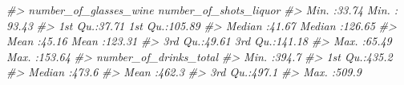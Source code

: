 \documentclass[
]{krantz}
\makeatletter
\newenvironment{Shaded}{\begin{snugshade}}{\end{snugshade}}
\newcommand{\CommentTok}[1]{\textcolor[rgb]{0.37,0.37,0.37}{\textit{#1}}}
\newenvironment{kframe}{%
\medskip{}
\setlength{\fboxsep}{.8em}
 \def\at@end@of@kframe{}%
 \ifinner\ifhmode%
  \def\at@end@of@kframe{\end{minipage}}%
  \begin{minipage}{\columnwidth}%
 \fi\fi%
 \def\FrameCommand##1{\hskip\@totalleftmargin \hskip-\fboxsep
 \colorbox{shadecolor}{##1}\hskip-\fboxsep
     \hskip-\linewidth \hskip-\@totalleftmargin \hskip\columnwidth}%
 \MakeFramed {\advance\hsize-\width
   \@totalleftmargin\z@ \linewidth\hsize
   \@setminipage}}%
 {\par\unskip\endMakeFramed%
 \at@end@of@kframe}
\renewenvironment{Shaded}{\begin{kframe}}{\end{kframe}}
\makeatother
\begin{document}
\begin{Shaded}
\begin{Highlighting}[]
\CommentTok{\#\textgreater{}  number\_of\_glasses\_wine number\_of\_shots\_liquor}
\CommentTok{\#\textgreater{}  Min.   :33.74          Min.   : 93.43        }
\CommentTok{\#\textgreater{}  1st Qu.:37.71          1st Qu.:105.89        }
\CommentTok{\#\textgreater{}  Median :41.67          Median :126.65        }
\CommentTok{\#\textgreater{}  Mean   :45.16          Mean   :123.31        }
\CommentTok{\#\textgreater{}  3rd Qu.:49.61          3rd Qu.:141.18        }
\CommentTok{\#\textgreater{}  Max.   :65.49          Max.   :153.64        }
\CommentTok{\#\textgreater{}  number\_of\_drinks\_total}
\CommentTok{\#\textgreater{}  Min.   :394.7         }
\CommentTok{\#\textgreater{}  1st Qu.:435.2         }
\CommentTok{\#\textgreater{}  Median :473.6         }
\CommentTok{\#\textgreater{}  Mean   :462.3         }
\CommentTok{\#\textgreater{}  3rd Qu.:497.1         }
\CommentTok{\#\textgreater{}  Max.   :509.9}
\end{Highlighting}
\end{Shaded}
\end{document}
